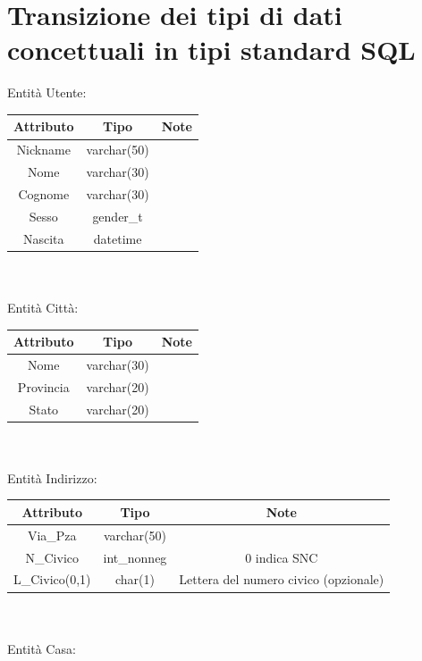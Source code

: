 \documentclass[a4paper,12pt]{report}
\begin{document}
    \chapter{Transizione dei tipi di dati concettuali in tipi standard SQL}
      Entità Utente: \\
      \begin{tabular}{|c|c|c|}
        \hline Attributo & Tipo & Note \\
        \hline Nickname & varchar(50) & \\
        \hline Nome & varchar(30) & \\
        \hline Cognome & varchar(30) & \\
        \hline Sesso & gender\_t & \\
        \hline Nascita & datetime & \\
        \hline
      \end{tabular} \\
      \vspace{24pt} \\
      Entità Città: \\
      \begin{tabular}{|c|c|c|}
        \hline Attributo & Tipo & Note \\
        \hline Nome & varchar(30) & \\
        \hline Provincia & varchar(20) & \\
        \hline Stato & varchar(20) & \\
        \hline
      \end{tabular} \\
      \vspace{24pt} \\
      Entità Indirizzo: \\
      \begin{tabular}{|c|c|c|}
        \hline Attributo & Tipo & Note \\
        \hline Via\_Pza & varchar(50) & \\
        \hline N\_Civico & int\_nonneg & 0 indica SNC \\
        \hline L\_Civico(0,1) & char(1) & Lettera del numero civico (opzionale) \\
        \hline
      \end{tabular} \\
      \vspace{24pt} \\
      Entità Casa: \\
\end{document}
